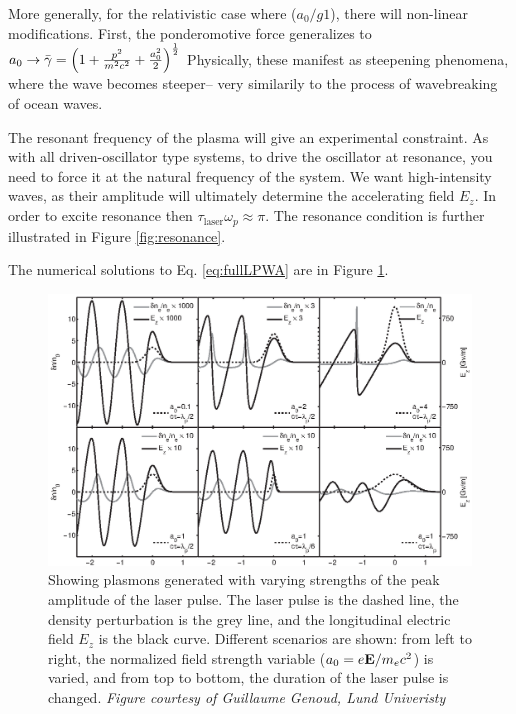 \documentclass[12pt,letter]{article}
\begin{document}
More generally, for the relativistic case where ($a_0 /g 1$), there will
non-linear modifications. First, the ponderomotive force generalizes to $a_0
\rightarrow \bar{\gamma} = \qty(1 + \frac{p^2}{m^2c^2} + \frac{a_0^2}{2})^\frac{1}{2}$ Physically, these manifest as steepening phenomena,
where the wave becomes steeper-- very similarily to the process of wavebreaking
of ocean waves.

The resonant frequency of the plasma will give an experimental constraint. As
with all driven-oscillator type systems, to drive the oscillator at resonance,
you need to force it at the natural frequency of the system. We want
high-intensity waves, as their amplitude will ultimately determine the
accelerating field $E_z$. In order to excite resonance then $\tau_\textrm{laser}
\omega_p \approx \pi$. The resonance condition is further illustrated in Figure
\ref{fig:resonance}.

The numerical solutions to Eq. \eqref{eq:fullLPWA} are in Figure \ref{fig:plasmon}.
   \begin{figure}[h!]
       \centering
       \includegraphics[width = \linewidth]{../figures/densityandewave.pdf}
       \caption{Showing plasmons generated with varying strengths of the peak
       amplitude of the laser pulse.\cite{genothesis}\label{fig:plasmon}
    The laser pulse is the dashed line, the density perturbation is the grey
line, and the longitudinal electric field $E_z$ is the black curve. Different
scenarios are shown: from left to right, the normalized field strength variable
($a_0 = e\vb{E}/m_e c^2$) is varied, and from top to bottom, the duration of
the laser pulse is changed. \em Figure courtesy of Guillaume Genoud, Lund
Univeristy}
   \end{figure}
\end{document}
